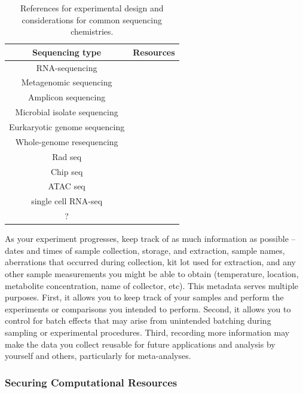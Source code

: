 \documentclass[10pt,letterpaper]{article}
\begin{document}
\begin{table}
\begin{tabular}{|c|c|}
\hline
\textbf{Sequencing type} & \textbf{Resources} \\
\hline
RNA-sequencing & \cite{conesa2016, schurch2016, ching2014} \\
\hline
Metagenomic sequencing & \cite{knight2012, quince2017, eisenhofer2019} \\
\hline
Amplicon sequencing & \cite{mclaren2019, murray2015, sinha2017 } \\
\hline
Microbial isolate sequencing & \cite{liao2015} \\
\hline
Eurkaryotic genome sequencing & \\
\hline
Whole-genome resequencing & \cite{fuentes2017} \\
\hline
Rad seq & \\
\hline
Chip seq & \\
\hline
ATAC seq & \\
\hline
single cell RNA-seq & \cite{bacher2016, haque2017} \\
\hline
? & \\
\hline
\end{tabular} 
\caption{\label{tab:seq_resources} References for experimental design and considerations for common sequencing chemistries.}
\end{table}

As your experiment progresses, keep track of as much information as possible -- dates and times of sample collection, storage, and extraction, sample names, aberrations that occurred during collection, kit lot used for extraction, and any other sample measurements you might be able to obtain (temperature, location, metabolite concentration, name of collector, etc). 
This metadata serves multiple purposes. 
First, it allows you to keep track of your samples and perform the experiments or comparisons you intended to perform. 
Second, it allows you to control for batch effects that may arise from unintended batching during sampling or experimental procedures. 
Third, recording more information may make the data you collect reusable for future applications and analysis by yourself and others, particularly for meta-analyses. 

\subsubsection*{Securing Computational Resources}
\end{document}
